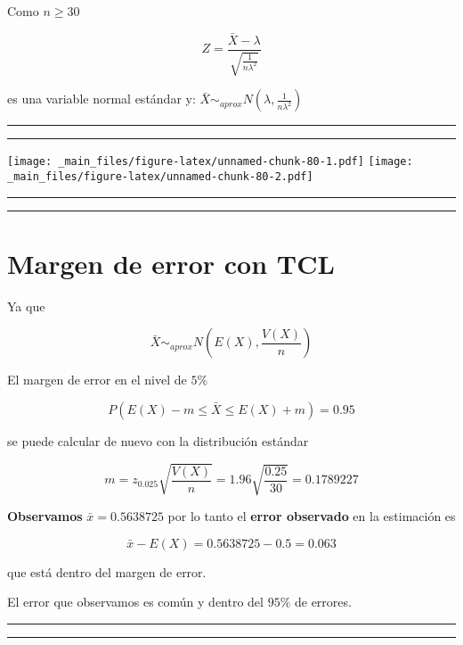 \documentclass[
]{book}
\begin{document}
Como \(n \geq 30\)

\[Z=\frac{\bar{X}-\lambda}{\sqrt{\frac{1}{n\lambda^2}}}\]

es una variable normal estándar y: \(\bar{X} \sim_{aprox} N(\lambda, \frac{1}{n\lambda^2})\)

\begin{center}\rule{0.5\linewidth}{0.5pt}\end{center}

\begin{center}\rule{0.5\linewidth}{0.5pt}\end{center}

\texttt{[image: \_main\_files/figure-latex/unnamed-chunk-80-1.pdf]} \texttt{[image: \_main\_files/figure-latex/unnamed-chunk-80-2.pdf]}

\begin{center}\rule{0.5\linewidth}{0.5pt}\end{center}

\begin{center}\rule{0.5\linewidth}{0.5pt}\end{center}

\hypertarget{margen-de-error-con-tcl}{%
\section{Margen de error con TCL}\label{margen-de-error-con-tcl}}

Ya que

\[\bar{X} \sim_{aprox} N(E(X), \frac{V(X)}{n})\]

El margen de error en el nivel de \(5\%\)

\[P(E(X)-m \leq \bar{X} \leq E(X) + m)=0.95\]

se puede calcular de nuevo con la distribución estándar

\[m=z_{0.025} \sqrt{\frac{V(X)}{n}}=1.96\sqrt{\frac{0.25}{30}}=0.1789227\]

\textbf{Observamos} \(\bar{x}=0.5638725\) por lo tanto el \textbf{error observado} en la estimación es

\[\bar{x} - E(X)=0.5638725-0.5=0.063\]

que está dentro del margen de error.

El error que observamos es común y dentro del \(95\%\) de errores.

\begin{center}\rule{0.5\linewidth}{0.5pt}\end{center}

\begin{center}\rule{0.5\linewidth}{0.5pt}\end{center}
\end{document}

